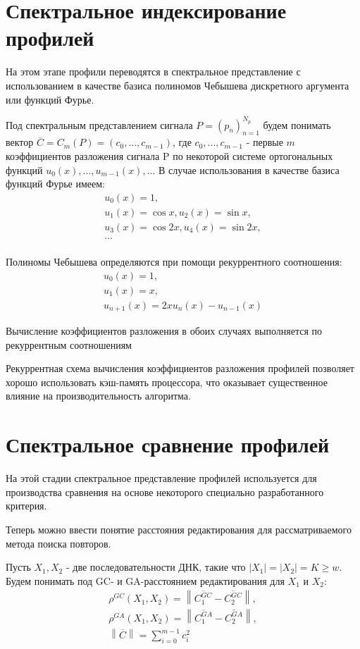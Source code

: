 \section{Спектральное индексирование профилей} \label{sect2_2}

На этом этапе профили переводятся в спектральное представление с использованием
в качестве базиса полиномов Чебышева дискретного аргумента или функций Фурье.

Под спектральным представлением сигнала $P=(p_n)_{n=1}^{N_p}$ будем понимать вектор
$\overline{C}=C_m(P)=(c_0,...,c_{m-1})$, где $c_0,...,c_{m-1}$ - первые $m$
коэффициентов разложения сигнала P по некоторой системе ортогональных функций
$u_0(x),...,u_{m-1}(x),...$
В случае использования в качестве базиса функций Фурье имеем:
$$
\begin{array}{rl}
    u_0(x)=1, \\
    u_1(x)=\cos{x}, u_2(x)=\sin{x}, \\
    u_3(x)=\cos{2x}, u_4(x)=\sin{2x}, \\
    ... \\
\end{array}
$$

Полиномы Чебышева определяются при помощи рекуррентного соотношения:
$$
\begin{array}{rl}
    u_0(x)=1, \\
    u_1(x)=x, \\
    u_{n+1}(x)=2xu_n(x)-u_{n-1}(x)
\end{array}
$$

Вычисление коэффициентов разложения в обоих случаях выполняется по
рекуррентным соотношениям

Рекуррентная схема вычисления коэффициентов разложения профилей позволяет
хорошо использовать кэш-память процессора, что оказывает существенное влияние на
производительность алгоритма.

\section{Спектральное сравнение профилей} \label{sect2_3}

На этой стадии спектральное представление профилей используется для
производства сравнения на основе некоторого специально разработанного критерия.

Теперь можно ввести понятие расстояния редактирования для рассматриваемого
метода поиска повторов.

Пусть $X_1,X_2$ - две последовательности ДНК, такие что $|X_1|=|X_2|=K \ge w$.
Будем понимать под GC- и GA-расстоянием редактирования для $X_1$ и $X_2$:
$$
\newcommand{\norm}[1]{\left\lVert#1\right\rVert}
\begin{array}{rl}
\rho^{GC}(X_1,X_2)= \norm{\overline{C_1^{GC}} - \overline{C_2^{GC}}}, \\
\rho^{GA}(X_1,X_2)= \norm{\overline{C_1^{GA}} - \overline{C_2^{GA}}}, \\
\norm{\overline{C}}=\sum_{i=0}^{m-1}c_i^2 \\
\end{array}
$$

